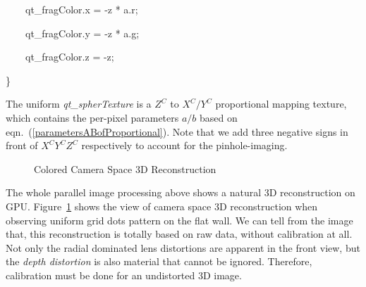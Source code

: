 \bigskip

{\ttfamily
\textcolor[rgb]{0.7529412,0.7529412,0.7529412}{\ \ \ \ }qt\_fragColor.x\textcolor[rgb]{0.7529412,0.7529412,0.7529412}{
} = \textcolor[rgb]{0.7529412,0.7529412,0.7529412}{
}{}-z\textcolor[rgb]{0.7529412,0.7529412,0.7529412}{
}*\textcolor[rgb]{0.7529412,0.7529412,0.7529412}{ }a.r;}

{\ttfamily
\textcolor[rgb]{0.7529412,0.7529412,0.7529412}{\ \ \ \ }qt\_fragColor.y\textcolor[rgb]{0.7529412,0.7529412,0.7529412}{
} = \textcolor[rgb]{0.7529412,0.7529412,0.7529412}{
}{}-z\textcolor[rgb]{0.7529412,0.7529412,0.7529412}{
}*\textcolor[rgb]{0.7529412,0.7529412,0.7529412}{ }a.g;}

{\ttfamily
\textcolor[rgb]{0.7529412,0.7529412,0.7529412}{\ \ \ \ }qt\_fragColor.z\textcolor[rgb]{0.7529412,0.7529412,0.7529412}{
} = \textcolor[rgb]{0.7529412,0.7529412,0.7529412}{ }{}-z;}

{\ttfamily
\}}

%
The uniform \emph{qt\_spherTexture} is a \(Z^C\) to \(X^C/Y^C\) proportional mapping texture, which contains the per-pixel parameters \(a/b\) based on eqn.~(\ref{parametersABofProportional}). Note that we add three negative signs in front of \(X^CY^CZ^C\) respectively to account for the pinhole-imaging. %
%
\begin{figure}[b]
\centering
{}
\caption{Colored Camera Space 3D Reconstruction}
\label{reconstructionInCameraSpace}
\end{figure}%
%
The whole parallel image processing above shows a natural 3D reconstruction on GPU. Figure~\ref{reconstructionInCameraSpace} shows the view of camera space 3D reconstruction when observing uniform grid dots pattern on the flat wall. We can tell from the image that, this reconstruction is totally based on raw data, without calibration at all. Not only the radial dominated lens distortions are apparent in the front view, but the \emph{depth distortion} is also material that cannot be ignored. Therefore, calibration must be done for an undistorted 3D image.

